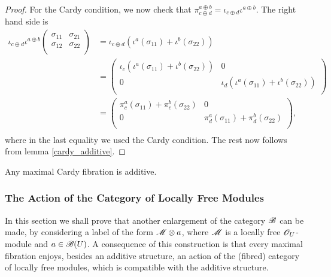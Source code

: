 \begin{proof}
For the Cardy condition, we now check that $\pi^{a\oplus b}_{c\oplus d}=\iota_{c\oplus d}\iota^{a\oplus b}$. The right hand side is
$$
\begin{aligned}
\iota_{c\oplus d}\iota^{a\oplus b}\left (\begin{smallmatrix} \sigma_{11} & \sigma_{21} \\ \sigma_{12} & \sigma_{22} \\ \end{smallmatrix} \right ) &= \iota_{c\oplus d}\left (\iota^a(\sigma_{11}) + \iota^b(\sigma_{22})\right ) \\
				  &= \left (\begin{smallmatrix} \iota_c\left (\iota^a(\sigma_{11})+\iota^b(\sigma_{22})\right ) & 0 \\ 0 & \iota_d\left (\iota^a(\sigma_{11})+\iota^b(\sigma_{22})\right ) \\ \end{smallmatrix} \right ) \\
					&= \left (\begin{smallmatrix} \pi^a_c(\sigma_{11})+\pi^b_c(\sigma_{22}) & 0 \\ 0 & \pi^a_d(\sigma_{11})+\pi^b_d(\sigma_{22}) \\ \end{smallmatrix} \right ), \\
\end{aligned}
$$
where in the last equality we used the Cardy condition. The rest now follows from lemma \ref{cardy_additive}.
\end{proof}

\begin{cor}
Any maximal Cardy fibration is additive.
\end{cor}


\subsubsection{The Action of the Category of Locally Free Modules}

In this section we shall prove that another enlargement of the category $\mathscr{B}$ can be made, by considering a label of the form $\mathscr{M}\otimes a$, where $\mathscr{M}$ is a locally free $\mathscr{O}_U$-module and $a\in \mathscr{B}(U)$. A consequence of this construction is that every maximal fibration enjoys, besides an additive structure, an action of the (fibred) category of locally free modules, which is compatible with the additive structure.

